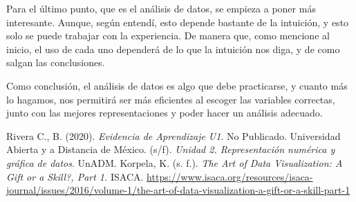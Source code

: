 \documentclass[12pt]{article}
\begin{document}
	\par Para el último punto, que es el análisis de datos, se empieza a poner más interesante. Aunque, según entendí, esto depende bastante de la intuición, y esto solo se puede trabajar con la experiencia. De manera que, como mencione al inicio, el uso de cada uno dependerá de lo que la intuición nos diga, y de como salgan las conclusiones.
	
	\par Como conclusión, el análisis de datos es algo que debe practicarse, y cuanto más lo hagamos, nos permitirá ser más eficientes al escoger las variables correctas, junto con las mejores representaciones y poder hacer un análisis adecuado.
	

\begin{thebibliography}{X}
	 Rivera C., B. (2020). \textit{Evidencia de Aprendizaje U1}. No Publicado.
	 Universidad Abierta y a Distancia de México. (s/f). \textit{Unidad 2. Representación numérica y gráfica de datos}. UnADM.
	 Korpela, K. (s. f.). \textit{The Art of Data Visualization: A Gift or a Skill?, Part 1. } ISACA. \url{https://www.isaca.org/resources/isaca-journal/issues/2016/volume-1/the-art-of-data-visualization-a-gift-or-a-skill-part-1}

 
\end{thebibliography}
\end{document}
